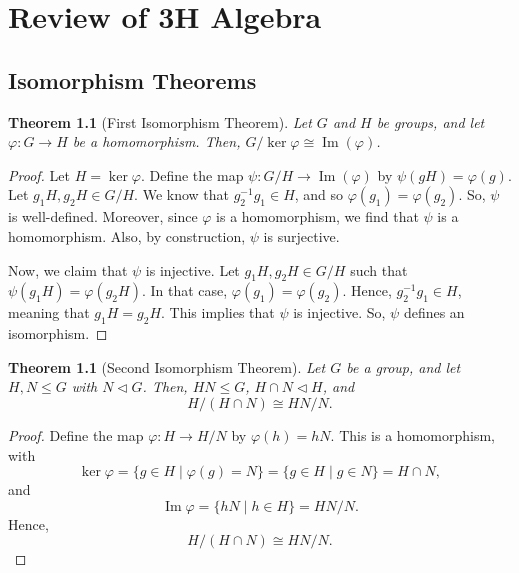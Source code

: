 \documentclass[a4paper, openany]{memoir}
\theoremstyle{definition}
\theoremstyle{plain}
\newtheorem{theorem}[definition]{Theorem}
\begin{document}
    \chapter{Review of 3H Algebra}
    \section{Isomorphism Theorems}

    \begin{theorem}[First Isomorphism Theorem]
        Let $G$ and $H$ be groups, and let $\varphi: G \to H$ be a homomorphism. Then, $G/\ker \varphi \cong \operatorname{Im}(\varphi)$.
    \end{theorem}
    \begin{proof}
        Let $H = \ker \varphi$. Define the map $\psi: G/H \to \operatorname{Im}(\varphi)$ by $\psi(gH) = \varphi(g)$. Let $g_1H, g_2H \in G/H$. We know that $g_2^{-1}g_1 \in H$, and so $\varphi(g_1) = \varphi(g_2)$. So, $\psi$ is well-defined. Moreover, since $\varphi$ is a homomorphism, we find that $\psi$ is a homomorphism. Also, by construction, $\psi$ is surjective.

        Now, we claim that $\psi$ is injective. Let $g_1H, g_2H \in G/H$ such that $\psi(g_1H) = \varphi(g_2H)$. In that case, $\varphi(g_1) = \varphi(g_2)$. Hence, $g_2^{-1}g_1 \in H$, meaning that $g_1H = g_2H$. This implies that $\psi$ is injective. So, $\psi$ defines an isomorphism.
    \end{proof}

    \begin{theorem}[Second Isomorphism Theorem]
        Let $G$ be a group, and let $H, N \leq G$ with $N \vartriangleleft G$. Then, $HN \leq G$, $H \cap N \vartriangleleft H$, and
        \[H/(H \cap N) \cong HN/N.\]
    \end{theorem}
    \begin{proof}
        Define the map $\varphi: H \to H/N$ by $\varphi(h) = hN$. This is a homomorphism, with
        \[\ker \varphi = \{g \in H \mid \varphi(g) = N\} = \{g \in H \mid g \in N\} = H \cap N,\]
        and
        \[\operatorname{Im} \varphi = \{hN \mid h \in H\} = HN/N.\]
        Hence, 
        \[H/(H \cap N) \cong HN/N.\]
    \end{proof}
\end{document}
